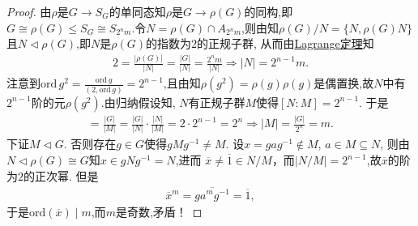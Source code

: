 \documentclass[../../main.tex]{subfiles}%
\begin{document}
\begin{proof}
由$\rho$是$G\to S_G$的单同态知$\rho$是$G\to \rho(G)$的同构,即$G\cong \rho(G)\leqslant S_G\cong S_{2^nm}$.令$N = \rho(G) \cap A_{2^n m}$,则由知$\rho(G)/N=\{N,\rho(G)N\}$且$N\lhd \rho(G)$,即$N$是$\rho(G)$的指数为$2$的正规子群, 从而由\hyperref[theorem:抽象代数--Lagrange定理]{Lagrange定理}知
\begin{align*}
2=\frac{|\rho(G)|}{|N|} = \frac{|G|}{|N|}=\frac{2^nm}{|N|} \Longrightarrow |N|=2^{n-1}m.
\end{align*}
注意到$\text{ord}\,g^2=\frac{\text{ord}\,g}{(2,\text{ord}\,g)}=2^{n-1}$,且由知$\rho(g^2)=\rho(g)\rho(g)$是偶置换,故$N$中有$2^{n-1}$阶的元$\rho(g^2)$.由归纳假设知, $N$有正规子群$M$使得$[N:M]=2^{n-1}$. 于是
\begin{align*}
[G:M]=\frac{|G|}{|M|}=\frac{|G|}{|N|}\cdot \frac{|N|}{|M|}=2\cdot 2^{n-1}=2^n\Longrightarrow |M|=\frac{|G|}{2^n}=m.
\end{align*}
下证$M \lhd G$. 否则存在$g \in G$使得$gMg^{-1} \neq M$. 设$x = gag^{-1} \notin M$, $a \in M\subseteq N$, 则由$N\lhd \rho(G)\cong G$知$x \in gNg^{-1} = N$,进而 $\overline{x} \neq \overline{1} \in N/M$，而$|N/M|=2^{n-1}$,故$\overline{x}$的阶为$2$的正次幂. 但是
\begin{align*}
\overline{x}^m = \overline{ga^m g^{-1}} = \overline{1},
\end{align*}
于是$\text{ord}(\overline{x}) \mid m$,而$m$是奇数,矛盾！

\end{proof}
\end{document}
